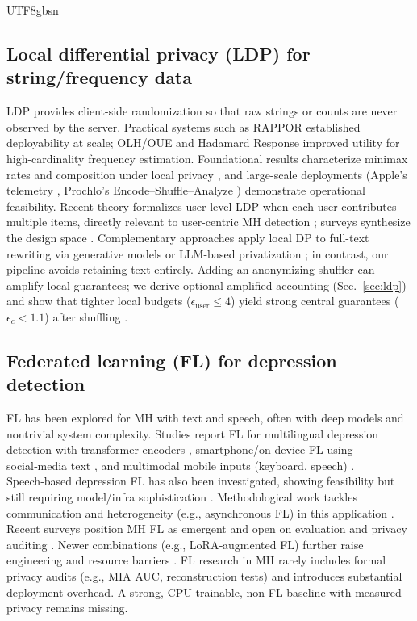 \documentclass[lettersize,journal]{IEEEtran}
\begin{document}
\begin{CJK*}{UTF8}{gbsn}
\subsection{Local differential privacy (LDP) for string/frequency data}
LDP provides client-side randomization so that raw strings or counts are never observed by the server. Practical systems such as RAPPOR \cite{erling2014rappor} established deployability at scale; OLH/OUE \cite{wang2017ldp} and Hadamard Response \cite{acharya2019hr} improved utility for high-cardinality frequency estimation. Foundational results characterize minimax rates and composition under local privacy \cite{duchi2013localprivacy,kairouz2015composition}, and large-scale deployments (Apple's telemetry \cite{apple2017privacy}, Prochlo's Encode--Shuffle--Analyze \cite{bittau2017prochlo}) demonstrate operational feasibility. Recent theory formalizes user-level LDP when each user contributes multiple items, directly relevant to user-centric MH detection \cite{acharya2023userldp}; surveys synthesize the design space \cite{wang2020surveyldp,qin2023ldpsurvey}. Complementary approaches apply local DP to full-text rewriting via generative models \cite{igamberdiev2023dpbart} or LLM-based privatization \cite{meisenbacher2024dpbox}; in contrast, our pipeline avoids retaining text entirely. Adding an anonymizing shuffler can amplify local guarantees; we derive optional amplified accounting (Sec.~\ref{sec:ldp}) and show that tighter local budgets ($\epsilon_{\text{user}} \le 4$) yield strong central guarantees ($\epsilon_c < 1.1$) after shuffling \cite{balle2019shuffle,erlingsson2019shuffle}.

\subsection{Federated learning (FL) for depression detection}
FL has been explored for MH with text and speech, often with deep models and nontrivial system complexity. Studies report FL for multilingual depression detection with transformer encoders \cite{khalil2024patterns}, smartphone/on‑device FL using social‑media text \cite{ahmed2024smartphonefl}, and multimodal mobile inputs (keyboard, speech) \cite{shin2023fedtherapist}. Speech‑based depression FL has also been investigated, showing feasibility but still requiring model/infra sophistication \cite{suhas2022flspeech,cui2022flspeechdepression}. Methodological work tackles communication and heterogeneity (e.g., asynchronous FL) in this application \cite{li2022cafed}. Recent surveys position MH FL as emergent and open on evaluation and privacy auditing \cite{grataloup2024surveyflmh}. Newer combinations (e.g., LoRA‑augmented FL) further raise engineering and resource barriers \cite{sarwar2025fedmentalcare}. FL research in MH rarely includes formal privacy audits (e.g., MIA AUC, reconstruction tests) and introduces substantial deployment overhead. A strong, CPU‑trainable, non‑FL baseline with measured privacy remains missing.


\end{CJK*}
\end{document}
